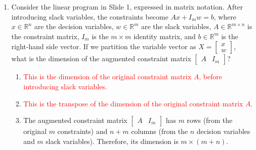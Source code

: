 \documentclass{article}%
\newcommand{\incorrect}[1]{\textcolor{red}{#1}}
\begin{document}
\begin{enumerate}
\begin{enumerate}
\begin{enumerate}%
\item \incorrect{The tables are not identical; they represent different aspects of the primal and dual problems.}%
\item \incorrect{While there's a relationship involving transposition, it's not a simple transpose with a sign change.}%
\item \incorrect{The tables are closely related, representing the primal and dual simplex methods, which are intimately connected through duality theory.}%
\item The tables represent the primal and dual simplex methods.  Strong duality implies that the optimal objective function values are equal (or negatives of each other, depending on the maximization/minimization). Complementary slackness is reflected in the relationship between the basic and non-basic variables in both tables.  If a primal variable is basic (non-zero), its corresponding dual variable is non-basic (zero), and vice-versa.%
\item \incorrect{The basic variable values are not simply negated; the relationship is more complex and involves the duality theorem.}%
\end{enumerate}%
\vspace{0.5em}%
\end{enumerate}%
\item Consider the linear program in Slide 1, expressed in matrix notation. After introducing slack variables, the constraints become $Ax + I_m w = b$, where $x \in \mathbb{R}^n$ are the decision variables, $w \in \mathbb{R}^m$ are the slack variables, $A \in \mathbb{R}^{m \times n}$ is the constraint matrix, $I_m$ is the $m \times m$ identity matrix, and $b \in \mathbb{R}^m$ is the right-hand side vector.  If we partition the variable vector as $X = \begin{bmatrix} x \\ w \end{bmatrix}$, what is the dimension of the augmented constraint matrix $\begin{bmatrix} A & I_m \end{bmatrix}$?%
\begin{enumerate}%
\item \incorrect{This is the dimension of the original constraint matrix $A$, before introducing slack variables.}%
\item \incorrect{This is the transpose of the dimension of the original constraint matrix $A$.}%
\item The augmented constraint matrix $\begin{bmatrix} A & I_m \end{bmatrix}$ has $m$ rows (from the original $m$ constraints) and $n + m$ columns (from the $n$ decision variables and $m$ slack variables). Therefore, its dimension is $m \times (m+n)$.%

\end{enumerate}
\end{enumerate}
\end{document}
